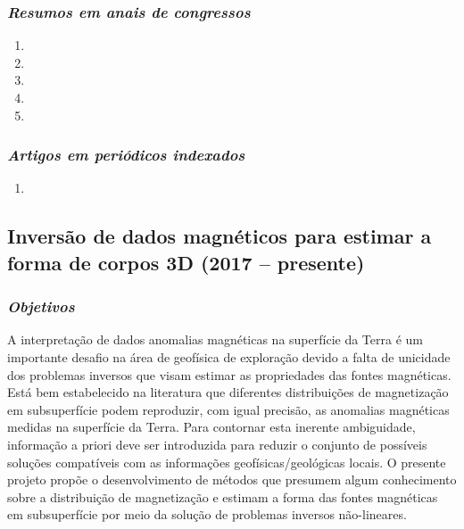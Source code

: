 \subsubsection{\emph{Resumos em anais de congressos}}

\begin{enumerate}
	\item {}
	\item {}
	\item {}
	\item {}
	\item {}
\end{enumerate}

\subsubsection{\emph{Artigos em periódicos indexados}}

\begin{enumerate}
	\item {}
	
\end{enumerate}


\subsection{Inversão de dados magnéticos para estimar a forma de corpos 3D (2017 -- presente)} \label{projeto-Leo}

\subsubsection{\emph{Objetivos}}

A interpretação de dados anomalias magnéticas na superfície da Terra é um importante desafio na área de geofísica de exploração devido a falta de unicidade dos problemas inversos que visam estimar as propriedades das fontes magnéticas. Está bem estabelecido na literatura que diferentes distribuições de magnetização em subsuperfície podem reproduzir, com igual precisão, as anomalias magnéticas medidas na superfície da Terra. Para contornar esta inerente ambiguidade, informação a priori deve ser introduzida para reduzir o conjunto de possíveis soluções compatíveis com as informações geofísicas/geológicas locais. O presente projeto propõe o desenvolvimento de métodos que presumem algum conhecimento sobre a distribuição de magnetização e estimam a forma das fontes magnéticas em subsuperfície por meio da solução de problemas inversos não-lineares. 

